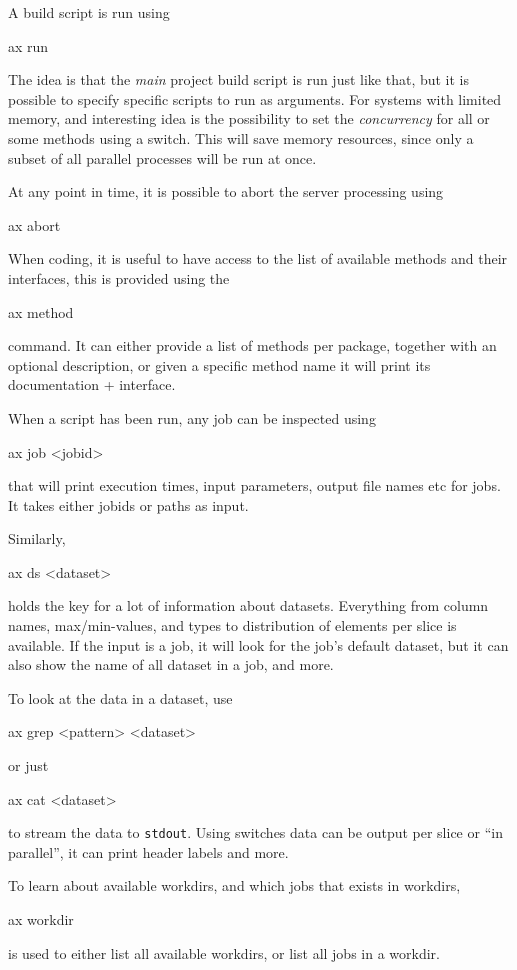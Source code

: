 A build script is run using
\begin{shell}
ax run
\end{shell}
The idea is that the \textsl{main} project build script is run just
like that, but it is possible to specify specific scripts to run as
arguments.  For systems with limited memory, and interesting idea is
the possibility to set the \textsl{concurrency} for all or some
methods using a switch.  This will save memory resources, since only a
subset of all parallel processes will be run at once.

At any point in time, it is possible to abort the server processing
using
\begin{shell}
ax abort
\end{shell}

When coding, it is useful to have access to the list of available
methods and their interfaces, this is provided using the
\begin{shell}
ax method
\end{shell}
command.  It can either provide a list of methods per package,
together with an optional description, or given a specific method name
it will print its documentation + interface.

When a script has been run, any job can be inspected using
\begin{shell}
ax job <jobid>
\end{shell}
that will print execution times, input parameters, output file names
etc for jobs.  It takes either jobids or paths as input.

Similarly,
\begin{shell}
ax ds <dataset>
\end{shell}
holds the key for a lot of information about datasets.  Everything
from column names, max/min-values, and types to distribution of
elements per slice is available.  If the input is a job, it will look
for the job's default dataset, but it can also show the name of all
dataset in a job, and more.

To look at the data in a dataset, use
\begin{shell}
ax grep <pattern> <dataset>
\end{shell}
or just
\begin{shell}
ax cat <dataset>
\end{shell}
to stream the data to \texttt{stdout}.  Using switches data can be
output per slice or ``in parallel'', it can print header labels and
more.

To learn about available workdirs, and which jobs that exists in workdirs,
\begin{shell}
ax workdir
\end{shell}
is used to either list all available workdirs, or list all jobs in a
workdir.

